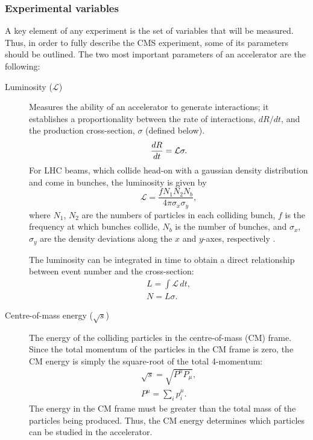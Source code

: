 \subsubsection*{Experimental variables}
A key element of any experiment is the set of variables that will be measured. Thus, in order to fully describe the CMS experiment, some of its parameters should be outlined. The two most important parameters of an accelerator are the following:
\begin{description}
    \item[Luminosity ($\mathcal{L}$)] Measures the ability of an accelerator to generate interactions; it establishes a proportionality between the rate of interactions, $dR/dt$, and the production cross-section, $\sigma$ (defined below).
    \begin{equation}
        \dv{R}{t} = \mathcal{L} \sigma.
    \end{equation}
    For LHC beams, which collide head-on with a gaussian density distribution and come in bunches, the luminosity is given by $$\mathcal{L} = \frac{f N_1 N_2 N_b}{4\pi \sigma_x \sigma_y},$$ where $N_1$, $N_2$ are the numbers of particles in each colliding bunch, $f$ is the frequency at which bunches collide, $N_b$ is the number of bunches, and $\sigma_{x}$, $\sigma_{y}$ are the density deviations along the $x$ and $y$-axes, respectively \cite{herr-luminosity,thomson_modern_2013}.
    
    The luminosity can be integrated in time to obtain a direct relationship between event number and the cross-section:
    \begin{align}
        L = \int \mathcal{L}\, dt,\\
        N = L\sigma.
    \end{align}
    
    \item[Centre-of-mass energy ($\sqrt{s}$)] The energy of the colliding particles in the centre-of-mass (CM) frame. Since the total momentum of the particles in the CM frame is zero, the CM energy is simply the square-root of the total 4-momentum:
    \begin{align}
        \sqrt{s} = \sqrt{P^\mu P_\mu},\\
        P^\mu = \sum_{i} p^{\mu}_{i}.
    \end{align}
    The energy in the CM frame must be greater than the total mass of the particles being produced. Thus, the CM energy determines which particles can be studied in the accelerator.
    
\end{description}

